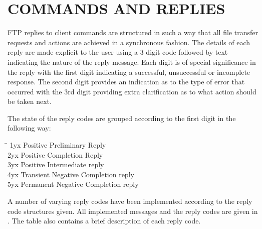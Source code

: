 \documentclass[10pt,twocolumn]{witseiepaper}
\begin{document}
%
\section{COMMANDS AND REPLIES}
\label{sec: Commands and Replies}

FTP replies to client commands are structured in such a way that all file transfer requests and actions are achieved in a synchronous fashion. The details of each reply are made explicit to the user using a 3 digit code followed by text indicating the nature of the reply message. Each digit is of special significance in the reply with the first digit indicating a successful, unsuccessful or incomplete response. The second digit provides an indication as to the type of error that occurred with the 3rd digit providing extra clarification as to what action should be taken next.

The state of the reply codes are grouped according to the first digit in the following way:
\begin{tabbing}
	\hspace{4em}\=\kill
	1yx	\> Positive Preliminary Reply \\ 
	2yx	\> Positive Completion Reply\\ 
	3yx	\> Positive Intermediate reply \\ 
	4yx	\> Transient Negative Completion reply \\ 
	5yx	\> Permanent Negative Completion reply
\end{tabbing} 


A number of varying reply codes have been implemented according to the reply code structures given. All implemented messages and the reply codes are given in . The table also contains a brief description of each reply code.
\end{document}
